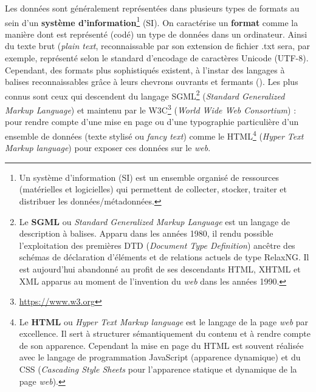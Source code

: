 Les données sont généralement représentées dans plusieurs types de formats au sein d'un \textbf{système d'information}\footnote{Un système d'information (SI) est un ensemble organisé de ressources (matérielles et logicielles) qui permettent de collecter, stocker, traiter et distribuer les données/métadonnées.} (SI). On caractérise un \textbf{format} comme la manière dont est représenté (codé) un type de données dans un ordinateur. Ainsi du texte brut (\textit{plain text}, reconnaissable par son extension de fichier .txt sera, par exemple, représenté selon le standard d'encodage de caractères Unicode (UTF-8). Cependant, des formats plus sophistiqués existent, à l'instar des langages à balises reconnaissables grâce à leurs chevrons ouvrants et fermants (\citecode{< >}). Les plus connus sont ceux qui descendent du langage SGML\footnote{Le \textbf{SGML} ou \textit{Standard Generalized Markup Language} est un langage de description à balises. Apparu dans les années 1980, il rendu possible l'exploitation des premières DTD (\textit{Document Type Definition}) ancêtre des schémas de déclaration d'éléments et de relations actuels de type RelaxNG. Il est aujourd'hui abandonné au profit de ses descendants HTML, XHTML et XML apparus au moment de l'invention du \textit{web} dans les années 1990.} (\textit{Standard Generalized Markup Language}) et maintenu par le W3C\footnote{\url{https://www.w3.org}} (\textit{World Wide Web Consortium}) : pour rendre compte d'une mise en page ou d'une typographie particulière d'un ensemble de données (texte stylisé ou \textit{fancy text}) comme le HTML\footnote{Le \textbf{HTML} ou \textit{Hyper Text Markup language} est le langage de la page \textit{web} par excellence. Il sert à structurer sémantiquement du contenu et à rendre compte de son apparence. Cependant la mise en page du HTML est souvent réalisée avec le langage de programmation JavaScript (apparence dynamique) et du CSS (\textit{Cascading Style Sheets} pour l'apparence statique et dynamique de la page \textit{web}).} (\textit{Hyper Text Markup language}) pour exposer ces données sur le \textit{web}.\\

